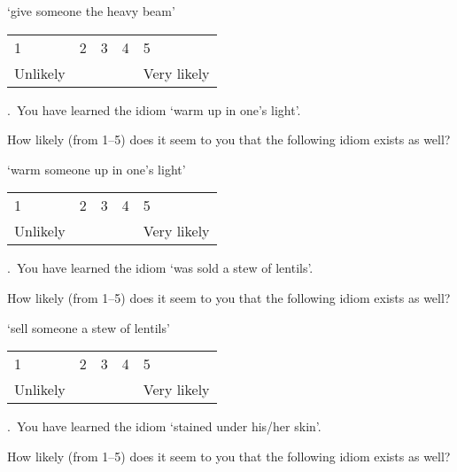 \documentclass[output=paper]{langsci/langscibook}
\begin{document}
\begin{paperappendix}
\noindent \enquote*{{give someone the heavy beam}}\vspace{.5\baselineskip}

\noindent \begin{tabularx}{\textwidth}{XXXXX}
        1 & 2 & 3 & 4 & 5\\
        Unlikely & & & & Very likely\\
        \end{tabularx}\vspace{1\baselineskip}

.\ You have learned the idiom \enquote*{{warm up in one's light}}.

\noindent How likely (from 1--5) does it seem to you that the following idiom exists
    as well?\vspace{.5\baselineskip}

\noindent \enquote*{{warm someone up in one's light}}\vspace{.5\baselineskip}

\noindent \begin{tabularx}{\textwidth}{XXXXX}
        1 & 2 & 3 & 4 & 5\\
        Unlikely & & & & Very likely\\
        \end{tabularx}\vspace{1\baselineskip}

.\ You have learned the idiom \enquote*{{was sold a stew of lentils}}.

\noindent How likely (from 1--5) does it seem to you that the following idiom exists
    as well?\vspace{.5\baselineskip}

\noindent \enquote*{{sell someone a stew of lentils}}\vspace{.5\baselineskip}

\noindent \begin{tabularx}{\textwidth}{XXXXX}
        1 & 2 & 3 & 4 & 5\\
        Unlikely & & & & Very likely\\
        \end{tabularx}\vspace{1\baselineskip}


.\ You have learned the idiom \enquote*{{stained under his/her
    skin}}.

\noindent How likely (from 1--5) does it seem to you that the following idiom exists
    as well?\vspace{.5\baselineskip}


\end{paperappendix}
\end{document}

